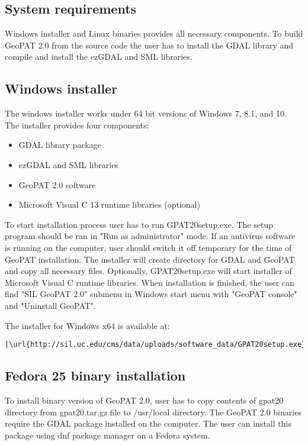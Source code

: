 \subsection{System requirements}

Windows installer and Linux binaries provides all necessary components. 
To build GeoPAT 2.0 from the source code the user has to install the GDAL library and compile and install the ezGDAL and SML libraries.

\subsection{Windows installer}
The windows installer works under 64 bit versions of Windows 7, 8.1, and 10.
The installer provides four components:
\begin{itemize}
  \item{GDAL library package}
  \item{ezGDAL and SML libraries}
  \item{GeoPAT 2.0 software}
  \item{Microsoft Visual C 13 runtime libraries (optional)}
\end{itemize}
To start installation process user has to run GPAT20setup.exe.
The setup program should be ran in "Run as administrator" mode.
If an antivirus software is running on the computer, user should 
switch it off temporary for the time of GeoPAT installation.
The installer will create directory for GDAL and GeoPAT and 
copy all necessary files. Optionally, GPAT20setup.exe will
start installer of Microsoft Visual C runtime libraries.
When installation is finished, the user can find "SIL GeoPAT 2.0"
submenu in Windows start menu with "GeoPAT console" and "Uninstall GeoPAT".

The installer for Windows x64 is available at:

\begin{lstlisting}[escapechar=|]
|\url{http://sil.uc.edu/cms/data/uploads/software_data/GPAT20setup.exe}|
\end{lstlisting}

\subsection{Fedora 25 binary installation}
To install binary version of GeoPAT 2.0, user has to copy contents
of gpat20 directory from gpat20.tar.gz file to /usr/local directory.
The GeoPAT 2.0 binaries require the GDAL package installed on the computer.
The user can install this package using dnf package manager on a Fedora system.

